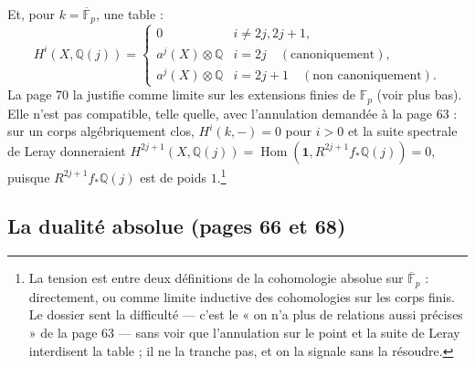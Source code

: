 \documentclass[11pt,a4paper]{article}
\begin{document}
Et, pour $k = \overline{\mathbb{F}}_{p}$, une table :
\[
H^{i}(X, \mathbb{Q}(j)) =
\begin{cases}
0 & i \neq 2j, 2j+1 , \\
a^{j}(X) \otimes \mathbb{Q} & i = 2j \quad (\text{canoniquement}) , \\
a^{j}(X) \otimes \mathbb{Q} & i = 2j+1 \quad (\text{non canoniquement}) .
\end{cases}
\]
La page 70 la justifie comme limite sur les extensions finies de $\mathbb{F}_{p}$
(voir plus bas). Elle n'est pas compatible, telle quelle, avec l'annulation
demandée à la page 63 : sur un corps algébriquement clos, $H^{i}(k, -) = 0$ pour
$i > 0$ et la suite spectrale de Leray donneraient $H^{2j+1}(X, \mathbb{Q}(j)) =
\operatorname{Hom}(\mathbf{1}, R^{2j+1}f_{*}\mathbb{Q}(j)) = 0$, puisque
$R^{2j+1}f_{*}\mathbb{Q}(j)$ est de poids $1$.\footnote{La tension est entre deux
définitions de la cohomologie absolue sur $\overline{\mathbb{F}}_{p}$ : directement,
ou comme limite inductive des cohomologies sur les corps finis. Le dossier
sent la difficulté --- c'est le « on n'a plus de relations aussi précises » de
la page 63 --- sans voir que l'annulation sur le point et la suite de Leray
interdisent la table ; il ne la tranche pas, et on la signale sans la
résoudre.}

\subsection*{La dualité absolue (pages 66 et 68)}
\end{document}
